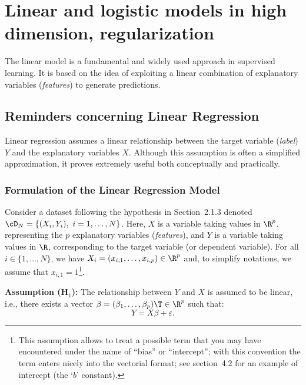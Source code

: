 \chapter[Linear and logistic models]{Linear and logistic models in high dimension, regularization}

The linear model is a fundamental and widely used approach in supervised
learning. It is based on the idea of exploiting a linear combination of explanatory
variables (\emph{features}) to generate predictions.

\section{Reminders concerning Linear Regression}

Linear regression assumes a linear relationship between the target variable
(\emph{label}) $Y$ and the explanatory variables $X$. Although this assumption is often
a simplified approximation, it proves extremely useful both conceptually and
practically.

\subsection{Formulation of the Linear Regression Model}

Consider a dataset following the hypothesis in Section~2.1.3 denoted
$\cD_N = \{(X_i, Y_i),\ i = 1, \ldots, N\}$. Here, $X$ is a variable taking values in $\R^p$,
representing the $p$ explanatory variables (\emph{features}), and $Y$ is a variable taking
values in $\R$, corresponding to the target variable (or dependent variable). For all
$i \in \{1, \ldots, N\}$, we have $X_i = (x_{i,1}, \ldots, x_{i,p}) \in \R^p$ and, to simplify
notations, we assume that $x_{i,1} = 1$\footnote{This assumption allows to treat a possible term that you may have encountered under the name of ``bias'' or ``intercept''; with this convention the term enters nicely into the vectorial format; see section~4.2 for an example of intercept (the `$b$' constant).}.

\begin{tcolorbox}[remarkbox]
\textbf{Assumption (H$_1$):} The relationship between $Y$ and $X$ is assumed to be
linear, i.e., there exists a vector $\beta = (\beta_1, \ldots, \beta_p)\T \in \R^p$ such that:
\begin{equation}\label{eq:ch4-linear-model}
Y = X\beta + \varepsilon.
\end{equation}
\end{tcolorbox}


